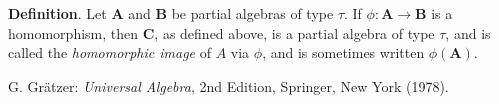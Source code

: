 \documentclass[12pt]{article}
\begin{document}
\textbf{Definition}.  Let $\boldsymbol{A}$ and $\boldsymbol{B}$ be partial algebras of type $\tau$.  If $\phi:\boldsymbol{A}\to \boldsymbol{B}$ is a homomorphism, then $\boldsymbol{C}$, as defined above, is a partial algebra of type $\tau$, and is called the \emph{homomorphic image} of $A$ via $\phi$, and is sometimes written $\phi(\boldsymbol{A})$.

\begin{thebibliography}{7}
 G. Gr\"{a}tzer: {\em Universal Algebra}, 2nd Edition, Springer, New York (1978).
\end{thebibliography}
\end{document}
